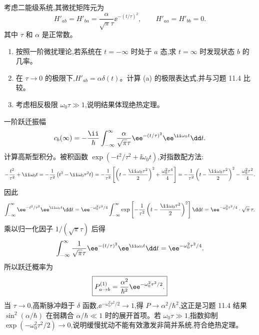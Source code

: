 \begin{question}
考虑二能级系统,其微扰矩阵元为
\[
H'_{ab}=H'_{ba}=\frac{\alpha}{\sqrt{\pi}\tau}\ee^{-(t/\tau)^2},\qquad H'_{aa}=H'_{bb}=0.
\]
其中 $\tau$ 和 $\alpha$ 是正常数。
\begin{enumerate}
\item 按照一阶微扰理论,若系统在 $t=-\infty$ 时处于 $a$ 态,求 $t=\infty$ 时发现状态 $b$ 的几率。
\item 在 $\tau\to0$ 的极限下,$H'_{ab}=\alpha\delta(t)$。计算 (a) 的极限表达式,并与习题 11.4 比较。
\item 考虑相反极限 $\omega_0\tau\gg1$,说明结果体现绝热定理。
\end{enumerate}
\begin{solution}
一阶跃迁振幅
\[
c_b(\infty)=-{\ii\over\hbar}\int_{-\infty}^{\infty}{\alpha\over\sqrt\pi\tau}\ee^{-(t/\tau)^2}\ee^{\ii\omega_0t}\dd t.
\]
计算高斯型积分。被积函数 $\exp(-t^2/\tau^2+\ii\omega_0t)$,对指数配方法:
\[
-{t^2\over\tau^2}+\ii\omega_0t
=-{1\over\tau^2}\left(t^2-\ii\omega_0\tau^2 t\right)
=-{1\over\tau^2}\left[\left(t-{\ii\omega_0\tau^2\over2}\right)^2+{\omega_0^2\tau^4\over4}\right]
=-{1\over\tau^2}\left(t-{\ii\omega_0\tau^2\over2}\right)^2-{\omega_0^2\tau^2\over4}.
\]
因此
\[
\int_{-\infty}^{\infty}\ee^{-t^2/\tau^2}\ee^{\ii\omega_0t}\dd t
=\ee^{-\omega_0^2\tau^2/4}\int_{-\infty}^{\infty}
\exp\left[-{1\over\tau^2}\left(t-{\ii\omega_0\tau^2\over2}\right)^2\right]\dd t
=\ee^{-\omega_0^2\tau^2/4}\cdot\sqrt\pi\,\tau.
\]
乘以归一化因子 $1/(\sqrt\pi\tau)$ 后得
\[
\int_{-\infty}^{\infty}{1\over\sqrt\pi\tau}\ee^{-(t/\tau)^2}\ee^{\ii\omega_0t}\dd t=\ee^{-\omega_0^2\tau^2/4}.
\]
所以跃迁概率为
\[
\boxed{P_{a\to b}^{(1)}={\alpha^2\over\hbar^2}\ee^{-\omega_0^2\tau^2/2}.}
\]
当 $\tau\to0$,高斯脉冲趋于 $\delta$ 函数,$\ee^{-\omega_0^2\tau^2/2}\to1$,得 $P\to\alpha^2/\hbar^2$,这正是习题 11.4 结果 $\sin^2(\alpha/\hbar)$ 在弱耦合 $\alpha/\hbar\ll1$ 时的展开首项。若 $\omega_0\tau\gg1$,指数抑制 $\exp(-\omega_0^2\tau^2/2)\to0$,说明缓慢扰动不能有效激发非简并系统,符合绝热定理。
\end{solution}
\end{question}

